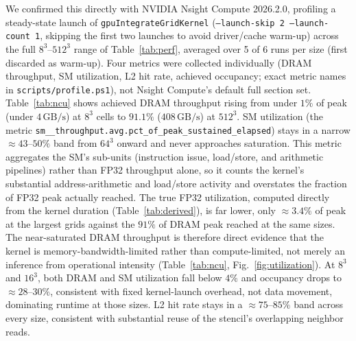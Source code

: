 \documentclass[conference]{IEEEtran}
\begin{document}
We confirmed this directly with NVIDIA Nsight Compute 2026.2.0, profiling a
steady-state launch of \texttt{gpuIntegrateGridKernel} (\texttt{--launch-skip 2
--launch-count 1}, skipping the first two launches to avoid driver/cache warm-up)
across the full $8^3$--$512^3$ range of Table~\ref{tab:perf}, averaged over 5 of 6
runs per size (first discarded as warm-up). Four metrics were collected
individually (DRAM throughput, SM utilization, L2 hit rate, achieved
occupancy; exact metric names in \texttt{scripts/profile.ps1}), not Nsight
Compute's default full section set. Table~\ref{tab:ncu} shows achieved DRAM
throughput rising from under $1\%$ of peak (under $4\,\text{GB/s}$) at $8^3$ cells to
$91.1\%$ ($408\,\text{GB/s}$) at $512^3$. SM utilization (the metric
\texttt{sm\_\_throughput.\allowbreak avg.\allowbreak pct\_of\_\allowbreak peak\_\allowbreak sustained\_\allowbreak elapsed})
stays in a narrow $\approx43$--$50\%$ band from $64^3$ onward and never approaches
saturation. This metric aggregates the SM's sub-units (instruction issue, load/store,
and arithmetic pipelines) rather than FP32 throughput alone, so it counts the kernel's
substantial address-arithmetic and load/store activity and overstates the fraction of
FP32 peak actually reached. The true FP32 utilization, computed directly from the
kernel duration (Table~\ref{tab:derived}), is far lower, only $\approx3.4\%$ of peak
at the largest grids against the $91\%$ of DRAM peak reached at the same sizes. The
near-saturated DRAM throughput is therefore direct evidence that the kernel is
memory-bandwidth-limited rather than compute-limited, not merely an inference from
operational intensity (Table~\ref{tab:ncu}, Fig.~\ref{fig:utilization}).
At $8^3$ and $16^3$, both DRAM and SM utilization fall below $4\%$ and occupancy
drops to $\approx28$--$30\%$, consistent with fixed kernel-launch overhead, not data
movement, dominating runtime at those sizes. L2 hit rate stays in a $\approx75$--$85\%$
band across every size, consistent with substantial reuse of the stencil's
overlapping neighbor reads.

\begin{table}[t]
\centering
\caption{Nsight Compute measurements of \texttt{gpuIntegrateGridKernel}: mean $\pm$
sample standard deviation over 5 of 6 runs per size (first discarded as warm-up).}
\label{tab:ncu}

\end{table}

\begin{table}[t]
\centering
\caption{Derived kernel performance metrics.}
\label{tab:derived}

\end{table}
\end{document}
